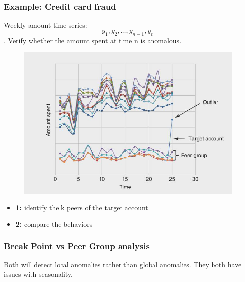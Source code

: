         \subsubsection{Example: Credit card fraud}
            Weekly amount time series: $$y_1,y_2,\dots,y_{n-1},y_n$$. Verify whether the amount spent at time n is anomalous.
            \begin{figure}[ht!]
                \centering
                \includegraphics[width=0.6\linewidth]{lecture_13/peer.png}
            \end{figure}
            \begin{itemize}
                \item \textbf{1:} identify the k peers of the target account
                \item \textbf{2:} compare the behaviors
            \end{itemize}
        \subsubsection{Break Point vs Peer Group analysis}
            Both will detect local anomalies rather than global anomalies. They both have issues with seasonality.